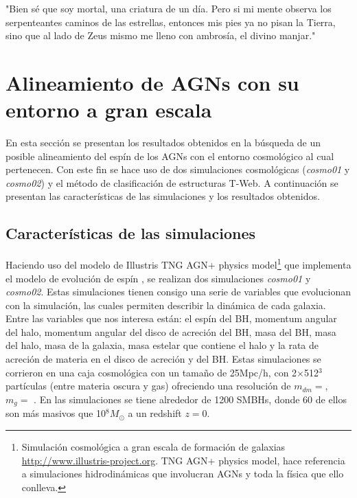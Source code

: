 \begin{savequote}[60mm]
"Bien sé que soy mortal, una criatura de un día. Pero si mi mente observa los serpenteantes caminos de las estrellas, entonces mis pies ya no pisan la Tierra, sino que al lado de Zeus mismo me lleno con ambrosía, el divino manjar."
\end{savequote}




\chapter{Alineamiento de AGNs con su entorno a gran escala}
\label{cha:cosmic_web}

En esta sección se presentan los resultados obtenidos en la búsqueda de un posible alineamiento del espín de los AGNs con el entorno cosmológico al cual pertenecen. Con este fin  se hace uso de dos simulaciones cosmológicas ({\it{cosmo01}} y {\it{cosmo02}}) y el método  de clasificación de estructuras T-Web. A continuación se presentan las características de las simulaciones y  los resultados obtenidos.

\section{Características de las simulaciones}
\label{sec: propiedades en las simulaciones}

Haciendo uso del modelo de Illustris TNG AGN+ physics model\footnote{Simulación cosmológica a gran escala de formación de galaxias \url{http://www.illustris-project.org}. TNG AGN+ physics model, hace referencia a simulaciones hidrodinámicas que involucran AGNs y toda la física que ello conlleva.} que implementa el modelo de evolución de espín \cite{Bustamante2018b}, se realizan dos simulaciones {\it{cosmo01}} y {\it{cosmo02}}. Estas simulaciones tienen consigo una serie de variables que evolucionan con la simulación, las cuales permiten describir la dinámica de cada galaxia.
Entre las variables que nos interesa están: el espín del BH, momentum angular del halo, momentum angular del disco de acreción del BH, masa del BH, masa del halo, masa de la galaxia, masa estelar que contiene el halo y la rata de acreción de materia en el disco de acreción y del BH. Estas simulaciones se corrieron en una caja cosmológica con un tamaño de 25Mpc/h, con 2$\times$512$^{3}$ partículas (entre materia oscura y gas) %
ofreciendo una resolución de $m_{dm}=$, $m_{g} = $ 
. En las simulaciones se tiene alrededor de 1200 SMBHs, donde 60 de ellos son más masivos que 10$^{8}M_{\odot}$ a un redshift $z=0$.

